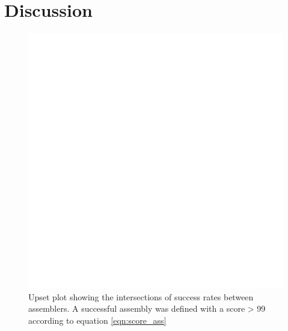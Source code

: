 \section{Discussion}

\begin{figure}[H]
\centering
\includegraphics[height=.45\textheight, width=.95\textwidth]{Figures/upset}
\decoRule
\caption[Upset plot comparing the success rates of of all assemblers]{Upset plot showing the intersections of success rates between assemblers. A successful assembly was defined with a score > 99 according to equation \ref{eqn:score_ass}}
\label{fig:upset}
\end{figure}


